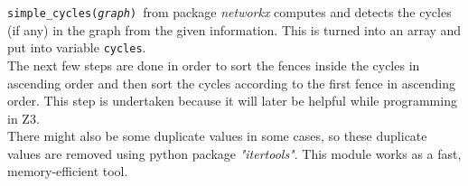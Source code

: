\documentclass[dvipsnames]{article}
\newcommand{\var}[1]{\color{OliveGreen} \texttt{#1}\color{black}}
\newcommand{\fun}[2]{\color{Sepia}\texttt{#1(\color{Gray}\textit{#2}\color{Sepia})}\color{black}}
\begin{document}
\fun{simple\_cycles}{graph}\ from package \textit{networkx} computes and detects the cycles (if any) in the graph from the given information. This is turned into an array and put into variable \var{cycles}.\\

The next few steps are done in order to sort the fences inside the cycles in ascending order and then sort the cycles according to the first fence in ascending order. This step is undertaken because it will later be helpful while programming in Z3.\\

There might also be some duplicate values in some cases, so these duplicate values are removed using python package \textit{"itertools"}. This module works as a fast, memory-efficient tool.
\end{document}
